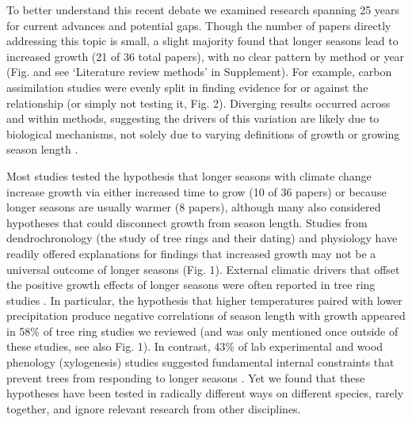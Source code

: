 \documentclass[11pt]{article}
\begin{document}
To better understand this recent debate we examined research spanning 25 years for current advances and potential gaps. Though the number of papers directly addressing this topic is small, a slight majority found that longer seasons lead to increased growth (21 of 36 total papers), with no clear pattern by method or year (Fig.  and see `Literature review methods' in Supplement). For example, carbon assimilation studies were evenly split in finding evidence for or against the relationship  (or simply not testing it, Fig. 2). Diverging results occurred across and within methods, suggesting the drivers of this variation are likely due to biological mechanisms, not solely due to varying definitions of growth or growing season length \citep[as some have recently suggested, e.g.][and see Box]{green2022limits,korner2023four}. 

Most studies tested the hypothesis that longer seasons with climate change increase growth via either increased time to grow (10 of 36 papers) or because longer seasons are usually warmer (8 papers), although many also considered hypotheses that could disconnect growth from season length. Studies from dendrochronology (the study of tree rings and their dating) and physiology have readily offered explanations for findings that increased growth may not be a universal outcome of longer seasons (Fig. 1). External climatic drivers that offset the positive growth effects of longer seasons were often reported in tree ring studies \citep{kolavr2016response,de2022temperature,camarero2022decoupled}. In particular, the hypothesis that higher temperatures paired with lower precipitation produce negative correlations of season length with growth appeared in 58\% of tree ring studies we reviewed (and was only mentioned once outside of these studies, see also Fig. 1). In contrast, 43\% of lab experimental and wood phenology (xylogenesis) studies suggested fundamental internal constraints that prevent trees from responding to longer seasons \citep[ED Fig. 2][]{cuny2012life,michelot2012comparing,zohner2023effect}. Yet we found that these hypotheses have been tested in radically different ways on different species, rarely together, and ignore relevant research from other disciplines. 
 
\end{document}
